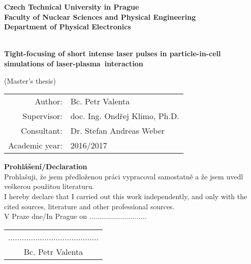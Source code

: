 \documentclass[12pt, twoside, a4paper, openright]{report}
\newcommand{\ctu}{Czech Technical University in Prague }
\newcommand{\fnspe}{Faculty of Nuclear Sciences and Physical Engineering }
\newcommand{\dpe}{Department of Physical Electronics }
\newcommand{\projecttitle}{Tight-focusing of short intense laser pulses in particle-in-cell simulations of laser-plasma~interaction }
\newcommand{\valenta}{Bc. Petr Valenta }
\newcommand{\klimo}{doc. Ing. Ondřej Klimo, Ph.D. }
\newcommand{\weber}{Dr. Stefan Andreas Weber }
\newcommand{\academicyear}{2016/2017 }
\begin{document}
\pagestyle{empty}



\begin{titlepage}

\begin{center}
{\Large \bf \ctu}\\[4mm]
{\Large \bf \fnspe}\\[4mm]
{\Large \bf \dpe}\\[16mm]
\epsfysize=45mm \\[12mm]
\begin{spacing}{2.0}
{\LARGE \bf \projecttitle}\\[2mm]
\end{spacing}
{\Large (Master's thesis)} \\
\vfill
\end{center}

\begin{flushleft}
\begin{tabular}{rl}
Author: & \valenta \\[1mm]
Supervisor: & \klimo \\[1mm]
Consultant: & \weber \\[1mm]
Academic year: & \academicyear \\[1mm]
\end{tabular}
\end{flushleft}

\end{titlepage}


\newpage
\mbox{}


\newpage



\newpage



\newpage
\null
\vfill
{\bf \noindent Prohlášení/Declaration} \\[5mm]
Prohlašuji, že jsem předloženou práci vypracoval samostatně a že jsem uvedl veškerou
použitou literaturu.\\[2mm]
I hereby declare that I carried out this work independently, and only with the cited sources, literature and other professional sources.\\
\vspace{5mm}V Praze dne/In Prague on .............................\hfill
\begin{tabular}{c}
........................................\\
\valenta
\end{tabular}
\end{document}
